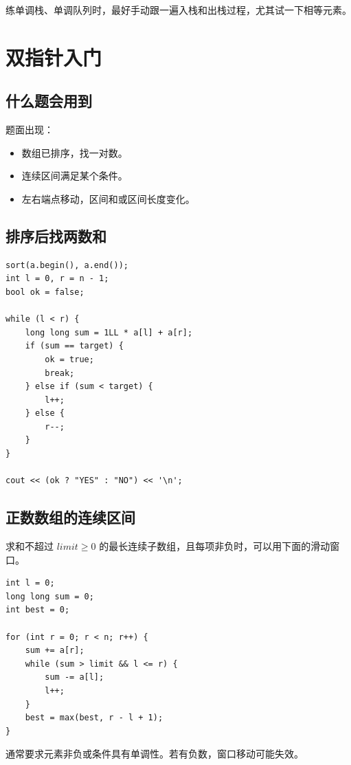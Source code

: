 练单调栈、单调队列时，最好手动跟一遍入栈和出栈过程，尤其试一下相等元素。

\section{双指针入门}\label{sec:06-16}

\subsection{什么题会用到}

题面出现：

\begin{itemize}
  \item 数组已排序，找一对数。
  \item 连续区间满足某个条件。
  \item 左右端点移动，区间和或区间长度变化。
\end{itemize}

\subsection{排序后找两数和}

\begin{lstlisting}
sort(a.begin(), a.end());
int l = 0, r = n - 1;
bool ok = false;

while (l < r) {
    long long sum = 1LL * a[l] + a[r];
    if (sum == target) {
        ok = true;
        break;
    } else if (sum < target) {
        l++;
    } else {
        r--;
    }
}

cout << (ok ? "YES" : "NO") << '\n';
\end{lstlisting}

\subsection{正数数组的连续区间}

求和不超过 $limit\ge0$ 的最长连续子数组，且每项非负时，可以用下面的滑动窗口。

\begin{lstlisting}
int l = 0;
long long sum = 0;
int best = 0;

for (int r = 0; r < n; r++) {
    sum += a[r];
    while (sum > limit && l <= r) {
        sum -= a[l];
        l++;
    }
    best = max(best, r - l + 1);
}
\end{lstlisting}

通常要求元素非负或条件具有单调性。若有负数，窗口移动可能失效。

